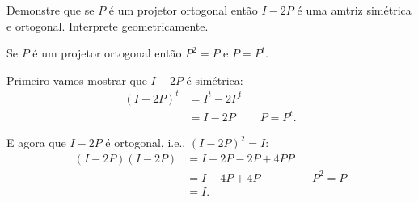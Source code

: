 \documentclass[a4paper,12pt, leqno, answers]{exam}
\begin{document}
\begin{questions}
\begin{solution}
\begin{center}
        \end{center}
    \end{solution}

    \question Demonstre que se $P$ \'{e} um projetor ortogonal ent\~{a}o $I - 2P$ \'{e} uma amtriz sim\'{e}trica e ortogonal. Interprete geometricamente.
    \begin{solution}
        Se $P$ \'{e} um projetor ortogonal ent\~{a}o $P^2 = P$ e $P = P^t$.
        
        Primeiro vamos mostrar que $I - 2P$ \'{e} sim\'{e}trica:
        \begin{align*}
            \left( I - 2 P \right)^t &= I^t - 2 P^t \\
            &= I - 2 P && P = P^t .
        \end{align*}

        E agora que $I - 2P$ \'{e} ortogonal, i.e., $\left( I - 2 P \right)^2 = I$:
        \begin{align*}
            \left( I - 2 P \right) \left( I - 2 P \right) &= I - 2 P - 2 P + 4 P P \\
            &= I - 4 P + 4 P && P^2 = P \\
            &= I .
        \end{align*}
    \end{solution}
\end{questions}


\end{document}
